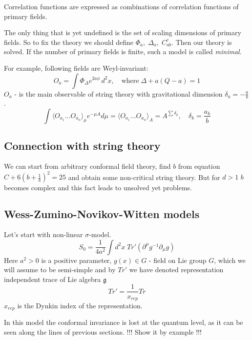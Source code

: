 \documentclass[a4paper,12pt]{article}
\theoremstyle{definition} \newtheorem{Def}{Definition}
\begin{document}
Correlation functions are expressed as combinations of correlation functions of primary fields.

The only thing that is yet undefined is the set of scaling dimensions of primary fields. So to fix the theory we should define $\Phi_a,\; \Delta_a,\; C^c_{ab}$. Then our theory is solved. If the number of primary fields is finite, such a model is called {\it minimal}.

For example, following fields are Weyl-invariant:
\begin{equation}
  \label{eq:68}
  O_a=\int \Phi_{\Delta}e^{2a\phi}\,d^2x,\quad \mbox{where}\;\Delta+a(Q-a)=1
\end{equation}
$O_a$ - is the main observable of string theory with gravitational dimension $\delta_a=-\frac{a}{b}$.
\begin{equation}
  \label{eq:69}
  \int\langle O_{a_1}\dots O_{a_n}\rangle_{\mu} e^{-\mu A}d\mu=\langle O_{a_1}\dots O_{a_n}\rangle_{A}=A^{\sum \delta_k},\quad \delta_k=\frac{a_k}{b}
\end{equation}
\subsection{Connection with string theory}

We can start from arbitrary conformal field theory, find $b$ from equation $C+6\left(b+\frac{1}{b}\right)^2=25$ and obtain some non-critical string theory. But for $d>1$ $b$ becomes complex and this fact leads to unsolved yet problems.


\subsection{Wess-Zumino-Novikov-Witten models}
\label{sec:WZNW}

Let's start with non-linear $\sigma$-model.
\begin{equation}
  \label{eq:48}
  S_0=\frac{1}{4a^2}\int d^2x\; Tr' (\partial^{\mu}g^{-1}\partial_{\mu}g)
\end{equation}
Here $a^2>0$ is a positive parameter, $g(x)\in G$ - field on Lie group $G$, which we will assume to be semi-simple and by $Tr'$ we have denoted representation independent trace of Lie algebra $\mathfrak{g} $
\begin{equation}
  \label{eq:70}
  Tr'=\frac{1}{x_{rep}}Tr
\end{equation}
$x_{rep}$ is the Dynkin index of the representation. 

In this model the conformal invariance is lost at the quantum level, as it can be seen along the lines of previous sections.
!!! Show it by example !!!
    
\end{document}
